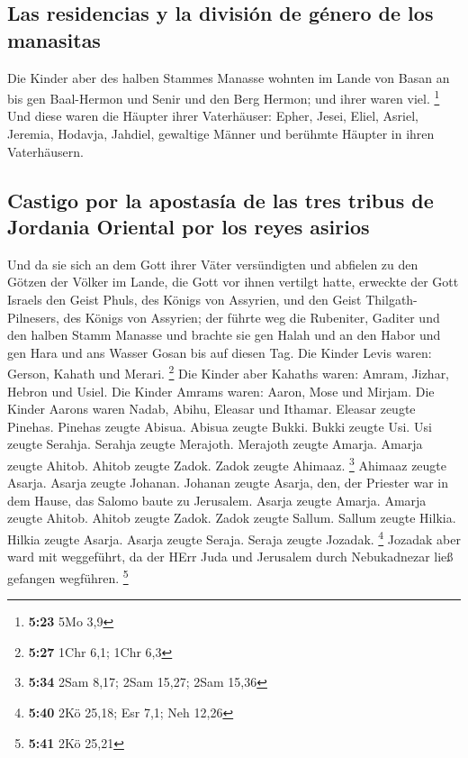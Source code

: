 \hypertarget{las-residencias-y-la-divisiuxf3n-de-guxe9nero-de-los-manasitas}{%
\subsection{Las residencias y la división de género de los
manasitas}\label{las-residencias-y-la-divisiuxf3n-de-guxe9nero-de-los-manasitas}}

 Die Kinder aber des halben Stammes Manasse wohnten im
Lande von Basan an bis gen Baal-Hermon und Senir und den Berg Hermon;
und ihrer waren viel. \footnote{\textbf{5:23} 5Mo 3,9} 
Und diese waren die Häupter ihrer Vaterhäuser: Epher, Jesei, Eliel,
Asriel, Jeremia, Hodavja, Jahdiel, gewaltige Männer und berühmte Häupter
in ihren Vaterhäusern.

\hypertarget{castigo-por-la-apostasuxeda-de-las-tres-tribus-de-jordania-oriental-por-los-reyes-asirios}{%
\subsection{Castigo por la apostasía de las tres tribus de Jordania
Oriental por los reyes
asirios}\label{castigo-por-la-apostasuxeda-de-las-tres-tribus-de-jordania-oriental-por-los-reyes-asirios}}

 Und da sie sich an dem Gott ihrer Väter versündigten und
abfielen zu den Götzen der Völker im Lande, die Gott vor ihnen vertilgt
hatte,  erweckte der Gott Israels den Geist Phuls, des
Königs von Assyrien, und den Geist Thilgath-Pilnesers, des Königs von
Assyrien; der führte weg die Rubeniter, Gaditer und den halben Stamm
Manasse und brachte sie gen Halah und an den Habor und gen Hara und ans
Wasser Gosan bis auf diesen Tag.  Die Kinder Levis waren:
Gerson, Kahath und Merari. \footnote{\textbf{5:27} 1Chr 6,1; 1Chr 6,3}
 Die Kinder aber Kahaths waren: Amram, Jizhar, Hebron und
Usiel.  Die Kinder Amrams waren: Aaron, Mose und Mirjam.
Die Kinder Aarons waren Nadab, Abihu, Eleasar und Ithamar.
 Eleasar zeugte Pinehas. Pinehas zeugte Abisua.
 Abisua zeugte Bukki. Bukki zeugte Usi. 
Usi zeugte Serahja. Serahja zeugte Merajoth.  Merajoth
zeugte Amarja. Amarja zeugte Ahitob.  Ahitob zeugte
Zadok. Zadok zeugte Ahimaaz. \footnote{\textbf{5:34} 2Sam 8,17; 2Sam
  15,27; 2Sam 15,36}  Ahimaaz zeugte Asarja. Asarja
zeugte Johanan.  Johanan zeugte Asarja, den, der Priester
war in dem Hause, das Salomo baute zu Jerusalem.  Asarja
zeugte Amarja. Amarja zeugte Ahitob.  Ahitob zeugte
Zadok. Zadok zeugte Sallum.  Sallum zeugte Hilkia. Hilkia
zeugte Asarja.  Asarja zeugte Seraja. Seraja zeugte
Jozadak. \footnote{\textbf{5:40} 2Kö 25,18; Esr 7,1; Neh 12,26}
 Jozadak aber ward mit weggeführt, da der HErr Juda und
Jerusalem durch Nebukadnezar ließ gefangen wegführen. \footnote{\textbf{5:41}
  2Kö 25,21}


